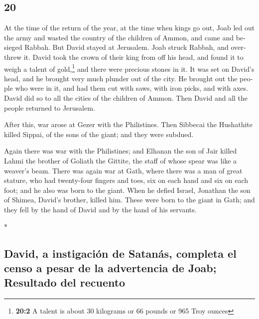 \begin{paracol}{2}
\switchcolumn
\begin{otherlanguage}{english}

\hypertarget{section-39}{%
\section{20}\label{section-39}}

 At the time of the return of the year, at the time when
kings go out, Joab led out the army and wasted the country of the
children of Ammon, and came and besieged Rabbah. But David stayed at
Jerusalem. Joab struck Rabbah, and overthrew it.  David
took the crown of their king from off his head, and found it to weigh a
talent of gold,\footnote{\textbf{20:2} A talent is about 30 kilograms or
  66 pounds or 965 Troy ounces} and there were precious stones in it. It
was set on David's head, and he brought very much plunder out of the
city.  He brought out the people who were in it, and had
them cut with saws, with iron picks, and with axes. David did so to all
the cities of the children of Ammon. Then David and all the people
returned to Jerusalem.

 After this, war arose at Gezer with the Philistines. Then
Sibbecai the Hushathite killed Sippai, of the sons of the giant; and
they were subdued.

 Again there was war with the Philistines; and Elhanan the
son of Jair killed Lahmi the brother of Goliath the Gittite, the staff
of whose spear was like a weaver's beam.  There was again
war at Gath, where there was a man of great stature, who had twenty-four
fingers and toes, six on each hand and six on each foot; and he also was
born to the giant.  When he defied Israel, Jonathan the
son of Shimea, David's brother, killed him.  These were
born to the giant in Gath; and they fell by the hand of David and by the
hand of his servants.

\end{otherlanguage}

\switchcolumn[0]*

\hypertarget{david-a-instigaciuxf3n-de-satanuxe1s-completa-el-censo-a-pesar-de-la-advertencia-de-joab-resultado-del-recuento}{%
\subsection{David, a instigación de Satanás, completa el censo a pesar
de la advertencia de Joab; Resultado del
recuento}\label{david-a-instigaciuxf3n-de-satanuxe1s-completa-el-censo-a-pesar-de-la-advertencia-de-joab-resultado-del-recuento}}


\end{paracol}
